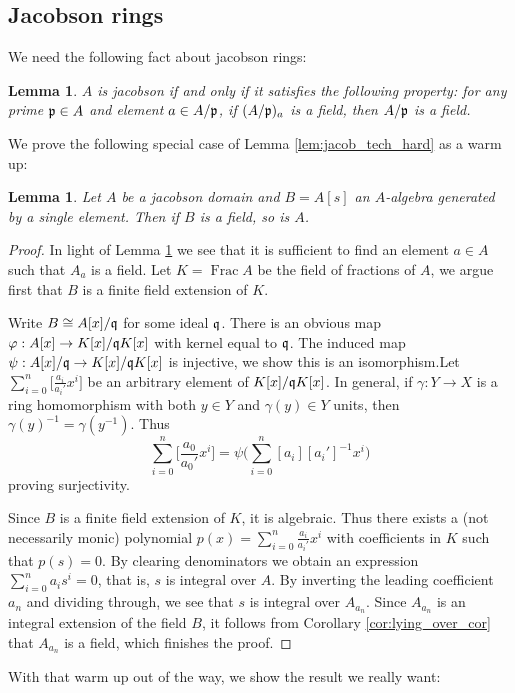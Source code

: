 \documentclass[12pt]{article}
\theoremstyle{plain}
\newtheorem{lemma}[thm]{Lemma}
\theoremstyle{definition}
\begin{document}
	\subsection{Jacobson rings}
	We need the following fact about jacobson rings:
	\begin{lemma}\label{lem:jacob_def}
		$A$ is jacobson if and only if it satisfies the following property: for any prime $\frak{p} \in A$ and element $a \in A/\frak{p}$, if $(A/\frak{p})_a$ is a field, then $A/\frak{p}$ is a field.
	\end{lemma}
	We prove the following special case of Lemma \ref{lem:jacob_tech_hard} as a warm up:
	\begin{lemma}\label{lem:jacob_tech_easy}
		Let $A$ be a jacobson domain and $B = A[s]$ an $A$-algebra generated by a single element. Then if $B$ is a field, so is $A$.
	\end{lemma}
	\begin{proof}
		In light of Lemma \ref{lem:jacob_def} we see that it is sufficient to find an element $a \in A$ such that $A_a$ is a field. Let $K = \operatorname{Frac}A$ be the field of fractions of $A$, we argue first that $B$ is a finite field extension of $K$.
		
		Write $B \cong A[x]/\frak{q}$ for some ideal $\frak{q}$. There is an obvious map $\varphi: A[x] \to K[x]/\frak{q}K[x]$ with kernel equal to $\frak{q}$. The induced map $\psi: A[x]/\frak{q} \to K[x]/\frak{q}K[x]$ is injective, we show this is an isomorphism.Let $\sum_{i = 0}^n\big[\frac{a_i}{a_i'}x^i\big]$ be an arbitrary element of $K[x]/\frak{q}K[x]$. In general, if $\gamma: Y \to X$ is a ring homomorphism with both $y \in Y$ and $\gamma(y) \in Y$ units, then $\gamma(y)^{-1} = \gamma(y^{-1}).$ Thus 
		\[\sum_{i = 0}^n\big[\frac{a_0}{a_0'}x^i\big] = \psi\Big(\sum_{i = 0}^n[a_i][a_i']^{-1}x^i\Big)\]
		proving surjectivity.
		
		Since $B$ is a finite field extension of $K$, it is algebraic. Thus there exists a (not necessarily monic) polynomial $p(x) = \sum_{i = 0}^n\frac{a_i}{a_i'}x^i$ with coefficients in $K$ such that $p(s) = 0$. By clearing denominators we obtain an expression $\sum_{i = 0}^na_i s^i = 0$, that is, $s$ is integral over $A$. By inverting the leading coefficient $a_n$ and dividing through, we see that $s$ is integral over $A_{a_n}$. Since $A_{a_n}$ is an integral extension of the field $B$, it follows from Corollary \ref{cor:lying_over_cor} that $A_{a_n}$ is a field, which finishes the proof.
	\end{proof}
	With that warm up out of the way, we show the result we really want:
\end{document}
